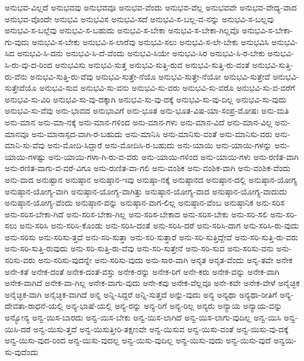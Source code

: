 {ಅನುಭವ-ವಿಲ್ಲದೆ
ಅನುಭವವು
ಅನುಭವವೂ
ಅನುಭವ-ವೆಂದು
ಅನುಭವ-ವೆಲ್ಲ
ಅನುಭವವೇ
ಅನುಭವ-ವೇದ್ಯ-ವಾದ
ಅನುಭವ-ವೊಂದೇ
ಅನುಭವಿ
ಅನುಭವಿಸ
ಅನುಭವಿ-ಸದೆ
ಅನುಭವಿ-ಸ-ಬಲ್ಲ-ವ-ನನ್ನು
ಅನುಭವಿ-ಸ-ಬಲ್ಲವು
ಅನುಭವಿ-ಸ-ಬಲ್ಲೆವು
ಅನುಭವಿ-ಸ-ಬಹುದು
ಅನುಭವಿ-ಸ-ಬೇಕಾ
ಅನುಭವಿ-ಸ-ಬೇಕಾ-ಗಿಲ್ಲವೊ
ಅನುಭವಿ-ಸ-ಬೇಕಾ-ಗು-ವುದು
ಅನುಭವಿ-ಸ-ಬೇಕು
ಅನುಭವಿ-ಸ-ಲಾರೆವು
ಅನುಭವಿ-ಸಲು
ಅನುಭವಿ-ಸ-ಲೇ-ಬೇಕು
ಅನುಭವಿಸಿ
ಅನುಭವಿ-ಸಿದ
ಅನುಭವಿ-ಸಿ-ದನು
ಅನುಭವಿ-ಸಿ-ದೆ-ವೆಂದು
ಅನುಭವಿ-ಸಿಯೇ
ಅನುಭವಿ-ಸಿರ
ಅನುಭವಿ-ಸಿ-ರ-ಬೇಕು
ಅನುಭವಿ-ಸಿ-ರು-ವು-ದ-ರಿಂದ
ಅನುಭವಿಸು
ಅನುಭವಿ-ಸುತ್ತ
ಅನುಭವಿ-ಸುತ್ತಿ-ರುವ
ಅನುಭವಿ-ಸುತ್ತಿ-ರು-ವಂತೆ
ಅನುಭವಿ-ಸುತ್ತಿ-ರು-ವೆನು
ಅನುಭವಿ-ಸುತ್ತಿ-ರು-ವೆವು
ಅನುಭವಿ-ಸುತ್ತೇ-ನೆಯೊ
ಅನುಭವಿ-ಸುತ್ತೇ-ನೆಯೋ
ಅನುಭವಿ-ಸುತ್ತೇವೆ
ಅನುಭವಿ-ಸುತ್ತೇವೆಯೊ
ಅನುಭವಿ-ಸುವ
ಅನುಭವಿ-ಸು-ವನು
ಅನುಭವಿ-ಸು-ವರು
ಅನುಭವಿ-ಸು-ವರೊ
ಅನುಭವಿ-ಸು-ವ-ವರೆಗೆ
ಅನುಭವಿ-ಸು-ವಿರಿ
ಅನುಭವಿ-ಸು-ವು-ದಕ್ಕಾಗಿ
ಅನುಭವಿ-ಸು-ವು-ದಕ್ಕೆ
ಅನುಭವಿ-ಸು-ವು-ದಿಲ್ಲ
ಅನುಭವಿ-ಸು-ವುದು
ಅನುಭವಿ-ಸು-ವೆವು
ಅನು-ಭಾವದ
ಅನುಭಾವಿಗೆ
ಅನು-ಭೂತ
ಅನು-ಭೂತ-ವಿಷ-ಯಾ-ಸಂಪ್ರ-ಮೋಷಃ
ಅನು-ಮತಿ
ಅನು-ಮಾನ
ಅನು-ಮಾ-ನಕ್ಕೆ
ಅನು-ಮಾನ-ಗಳಿಂದ
ಅನು-ಮಾನ-ಗಳು
ಅನು-ಮಾನ-ವಿದೆ
ಅನು-ಮಾನ-ವಿಲ್ಲ
ಅನು-ಮಾನವೂ
ಅನು-ಮಾನಾಸ್ಪದ-ವಾಗಿ-ರ-ಬಹುದು
ಅನು-ಮಾನಿಸಿ
ಅನು-ಮಾನಿಸು-ವಂತೆ
ಅನು-ಮಾನಿಸು-ವರು
ಅನು-ಮಾನಿ-ಸು-ವೆವು
ಅನು-ಮೋದಿ-ಸಿದ್ದಾರೆ
ಅನು-ಮೋದಿಸಿ-ರ-ಬಹುದು
ಅನು-ಯಾಯಿ
ಅನು-ಯಾಯಿ-ಗಳನ್ನು
ಅನು-ಯಾಯಿ-ಗಳಷ್ಟು
ಅನು-ಯಾಯಿ-ಗಳಾ-ಗಿ-ರು-ವ-ವರು
ಅನು-ಯಾಯಿ-ಗಳಿಂದ
ಅನು-ಯಾಯಿ-ಗಳು
ಅನು-ರಣಿತ-ವಾಗಿ
ಅನು-ರಣಿತ-ವಾಗು-ವ-ವರೆ-ವಿಗೂ
ಅನು-ರುಣಿತ-ವಾ-ಗಲಿ
ಅನು-ವಂಶಿಕ
ಅನು-ವಂಶಿಕ-ವಾಗಿ
ಅನು-ವಂಶಿಕ-ವೆಂದು
ಅನು-ವಾದ
ಅನುಷ್ಟಾನ
ಅನುಷ್ಠಾನ
ಅನುಷ್ಠಾನ-ಇವು
ಅನುಷ್ಠಾ-ನಕ್ಕೆ
ಅನುಷ್ಠಾನದ
ಅನುಷ್ಠಾನ-ದಲ್ಲಿ
ಅನುಷ್ಠಾನ-ಯೋಗ್ಯ
ಅನುಷ್ಠಾನ-ಯೋಗ್ಯ-ವಾಗಿ
ಅನುಷ್ಠಾನ-ಯೋಗ್ಯ-ವಾಗಿತ್ತು
ಅನುಷ್ಠಾನ-ಯೋಗ್ಯ-ವಾದ
ಅನುಷ್ಠಾನ-ಯೋಗ್ಯ-ವಾದುದು
ಅನುಷ್ಠಾನ-ಯೋಗ್ಯ-ವೆಂದು
ಅನುಷ್ಠಾನ-ವನ್ನು
ಅನುಷ್ಠಾನ-ವಾಗ-ಲಿಲ್ಲ
ಅನುಷ್ಠಾನ-ವೆಂಬ
ಅನುಷ್ಠಾನಿಕ
ಅನು-ಸರಿಸ
ಅನು-ಸರಿಸ-ಬೇಕಾ-ಗಿದೆ
ಅನು-ಸರಿಸ-ಬೇಕಾ-ಗಿಲ್ಲ
ಅನು-ಸರಿಸ-ಬೇಕಾದ
ಅನು-ಸರಿಸ-ಬೇಕು
ಅನು-ಸರಿ-ಸಲಿ
ಅನು-ಸರಿ-ಸಲು
ಅನು-ಸರಿಸಿ
ಅನು-ಸರಿಸಿ-ಕೊಂಡು
ಅನು-ಸರಿಸಿ-ದಂತೆ
ಅನು-ಸರಿಸಿ-ದರೆ
ಅನು-ಸರಿಸಿ-ದಾಗ
ಅನು-ಸರಿಸಿ-ರು-ವುದು
ಅನು-ಸರಿಸು
ಅನು-ಸರಿಸು-ತ್ತದೆ
ಅನು-ಸರಿ-ಸುತ್ತಾ
ಅನು-ಸರಿ-ಸುತ್ತಾರೆ
ಅನು-ಸರಿ-ಸುತ್ತಿದ್ದೇವೆ
ಅನು-ಸರಿ-ಸುತ್ತಿ-ರು-ವರು
ಅನು-ಸರಿ-ಸುತ್ತಿ-ರುವುದು
ಅನು-ಸರಿ-ಸುತ್ತಿ-ರು-ವೆವು
ಅನು-ಸರಿ-ಸುತ್ತೇನೆ
ಅನು-ಸರಿ-ಸುವ
ಅನು-ಸರಿಸು-ವನು
ಅನು-ಸರಿಸು-ವರು
ಅನು-ಸರಿಸು-ವುದನ್ನೇ
ಅನು-ಸರಿಸು-ವುದು
ಅನು-ಸಾರ-ವಾಗಿ
ಅನೃತ
ಅನೃತ-ವೆಂದು
ಅನೃ-ತವೇ
ಅನೇಕ
ಅನೇ-ಕತೆ
ಅನೇಕ-ದಂತೆ
ಅನೇಕ-ದಂತೆ-ವಸ್ತು
ಅನೇಕ-ರನ್ನು
ಅನೇಕ-ರಿಗೆ
ಅನೇ-ಕರು
ಅನೇಕ-ವನ್ನು
ಅನೇಕ-ವಾಗಿ
ಅನೇಕ-ವಾಗಿದೆ
ಅನೇಕ-ವಾ-ಗಿಲ್ಲ
ಅನೇಕ-ವಾಗು-ವುದು
ಅನೇ-ಕವು
ಅನೇಕ-ವೆಲ್ಲವೂ
ಅನೇ-ಕವೇ
ಅನೇಕ-ವೇಳೆ
ಅನೈಚ್ಛಿಕ
ಅನೈಚ್ಛಿಕ-ವಾಗಿ
ಅನೈಚ್ಛಿಕ-ವಾಗಿದೆ
ಅನ್ನ
ಅನ್ನಿ-ಸಿದ್ದರೆ
ಅನ್ನಿ-ಸುತ್ತದೆ
ಅನ್ನು-ವುದು
ಅನ್ಯ
ಅನ್ಯಥಾ
ಅನ್ಯಥಾ-ರೀತಿಗೆ
ಅನ್ಯ-ದೇವತಾ-ರಾಧನೆ-ಯಲ್ಲಿ
ಅನ್ಯ-ಭಾಷೆ-ಯಲ್ಲಿ
ಅನ್ಯ-ರನ್ನು
ಅನ್ಯ-ರಿಗೆ
ಅನ್ಯ-ರಿಲ್ಲ
ಅನ್ಯರು
ಅನ್ಯಾಯ
ಅನ್ಯಾಯ-ವನ್ನು
ಅನ್ಯೋನ್ಯ
ಅನ್ವ-ಯಿಸ-ಬಾರದು
ಅನ್ವ-ಯಿಸ-ಬೇಕು
ಅನ್ವ-ಯಿಸ-ಲಾಗಿದೆ
ಅನ್ವ-ಯಿಸ-ಲಾಗು-ವುದಿಲ್ಲ
ಅನ್ವ-ಯಿಸಿ
ಅನ್ವ-ಯಿಸಿ-ದರೆ
ಅನ್ವ-ಯಿಸು-ತ್ತದೆ
ಅನ್ವ-ಯಿಸುತ್ತೀರಿ-ತಕ್ಷಣವೇ
ಅನ್ವ-ಯಿಸುವ
ಅನ್ವ-ಯಿಸು-ವಂತೆ
ಅನ್ವ-ಯಿಸು-ವು-ದಕ್ಕೆ
ಅನ್ವ-ಯಿಸು-ವುದ-ರಿಂದ
ಅನ್ವ-ಯಿಸು-ವುದಲ್ಲ
ಅನ್ವ-ಯಿಸು-ವುದಿಲ್ಲ
ಅನ್ವ-ಯಿಸು-ವುದು
ಅನ್ವ-ಯಿಸು-ವುದೆ
ಅನ್ವಯಿ-ಸು-ವುದೆಂದು
}
